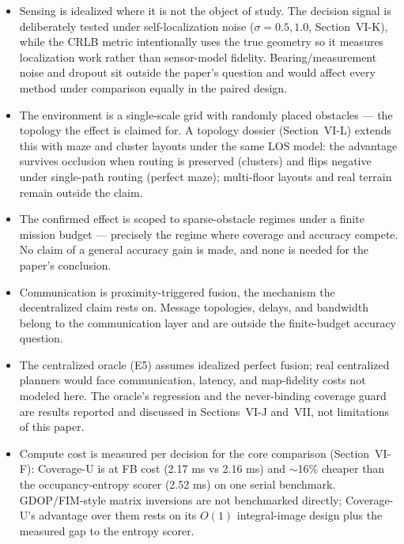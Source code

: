 \documentclass[journal]{IEEEtran}
\newcommand{\CU}{Coverage-U}
\begin{document}
\begin{itemize}
\item Sensing is idealized where it is not the object of study. The decision
signal is deliberately tested under self-localization noise ($\sigma = 0.5,
1.0$, Section~VI-K), while the CRLB metric intentionally uses the true geometry
so it measures localization work rather than sensor-model fidelity.
Bearing/measurement noise and dropout sit outside the paper's question and
would affect every method under comparison equally in the paired design.
\item The environment is a single-scale grid with randomly placed obstacles ---
the topology the effect is claimed for. A topology dossier
(Section~VI-L) extends this with maze and cluster layouts under the same LOS
model: the advantage survives occlusion when routing is preserved (clusters)
and flips negative under single-path routing (perfect maze); multi-floor
layouts and real terrain remain outside the claim.
\item The confirmed effect is scoped to sparse-obstacle regimes under a finite
mission budget --- precisely the regime where coverage and accuracy compete. No
claim of a general accuracy gain is made, and none is needed for the paper's
conclusion.
\item Communication is proximity-triggered fusion, the mechanism the
decentralized claim rests on. Message topologies, delays, and bandwidth belong
to the communication layer and are outside the finite-budget accuracy question.
\item The centralized oracle (E5) assumes idealized perfect fusion; real
centralized planners would face communication, latency, and map-fidelity costs
not modeled here. The oracle's regression and the never-binding coverage guard
are results reported and discussed in Sections~VI-J and~VII, not limitations
of this paper.
\item Compute cost is measured per decision for the core comparison
(Section~VI-F): \CU{} is at FB cost (2.17 ms vs 2.16 ms) and $\sim$16\% cheaper
than the occupancy-entropy scorer (2.52 ms) on one serial benchmark.
GDOP/FIM-style matrix inversions are not benchmarked directly; \CU's{}
advantage over them rests on its $O(1)$ integral-image design plus the measured
gap to the entropy scorer.
\end{itemize}
\end{document}
